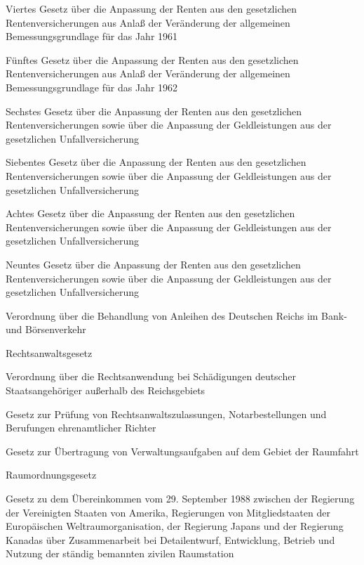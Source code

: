 \item[{RAG-4}] Viertes Gesetz über die Anpassung der Renten aus den gesetzlichen Rentenversicherungen aus Anlaß der Veränderung der allgemeinen Bemessungsgrundlage für das Jahr 1961

\item[{RAG-5}] Fünftes Gesetz über die Anpassung der Renten aus den gesetzlichen Rentenversicherungen aus Anlaß der Veränderung der allgemeinen Bemessungsgrundlage für das Jahr 1962

\item[{RAG-6}] Sechstes Gesetz über die Anpassung der Renten aus den gesetzlichen Rentenversicherungen sowie über die Anpassung der Geldleistungen aus der gesetzlichen Unfallversicherung

\item[{RAG-7}] Siebentes Gesetz über die Anpassung der Renten aus den gesetzlichen Rentenversicherungen sowie über die Anpassung der Geldleistungen aus der gesetzlichen Unfallversicherung

\item[{RAG-8}] Achtes Gesetz über die Anpassung der Renten aus den gesetzlichen Rentenversicherungen sowie über die Anpassung der Geldleistungen aus der gesetzlichen Unfallversicherung

\item[{RAG-9}] Neuntes Gesetz über die Anpassung der Renten aus den gesetzlichen Rentenversicherungen sowie über die Anpassung der Geldleistungen aus der gesetzlichen Unfallversicherung

\item[{RAnlV}] Verordnung über die Behandlung von Anleihen des Deutschen Reichs im Bank- und Börsenverkehr

\item[{RAnwG}] Rechtsanwaltsgesetz

\item[{RAnwV}] Verordnung über die Rechtsanwendung bei Schädigungen deutscher Staatsangehöriger außerhalb des Reichsgebiets

\item[{RAuaZulPrG}] Gesetz zur Prüfung von Rechtsanwaltszulassungen, Notarbestellungen und Berufungen ehrenamtlicher Richter

\item[{RAÜG}] Gesetz zur Übertragung von Verwaltungsaufgaben auf dem Gebiet der Raumfahrt

\item[{RaumOG}] Raumordnungsgesetz

\item[{RaumsÜbkG}] Gesetz zu dem Übereinkommen vom 29. September 1988 zwischen der Regierung der Vereinigten Staaten von Amerika, Regierungen von Mitgliedstaaten der Europäischen Weltraumorganisation, der Regierung Japans und der Regierung Kanadas über Zusammenarbeit bei Detailentwurf, Entwicklung, Betrieb und Nutzung der ständig bemannten zivilen Raumstation

